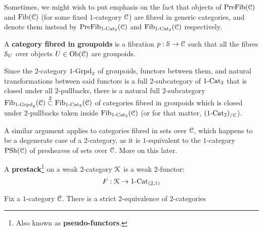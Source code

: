             \begin{convention}
                Sometimes, we might wish to put emphasis on the fact that objects of $\Pre\Fib(\C)$ and $\Fib(\C)$ (for some fixed $1$-category $\C$) are fibred in generic categories, and denote them instead by $\Pre\Fib_{1\-\Cat_2}(\C)$ and $\Fib_{1\-\Cat_2}(\C)$ respectively.
            \end{convention}
            \begin{definition} \label{def: categories_fibred_in_groupoids}
                A \textbf{category fibred in groupoids} is a fibration $p: \S \to \C$ such that all the fibres $\S_U$ over objects $U \in \Ob(\C)$ are groupoids. 
            \end{definition}
            \begin{remark}
                Since the $2$-category $1\-\Grpd_2$ of groupoids, functors between them, and natural transformations between said functors is a full $2$-subcategory of $1\-\Cat_2$ that is closed under all $2$-pullbacks, there is a natural full $2$-subcategory $\Fib_{1\-\Grpd_2}(\C) \overset{2}{\subset} \Fib_{1\-\Cat_2}(\C)$ of categories fibred in groupoids which is closed under $2$-pullbacks taken inside $\Fib_{1\-\Cat_2}(\C)$ (or for that matter, $(1\-\Cat_2)_{/\C}$).
                
                A similar argument applies to categories fibred in sets over $\C$, which happens to be a degenerate case of a $2$-category, as it is $1$-equivalent to the $1$-category $\Psh(\C)$ of presheaves of sets over $\C$. More on this later. 
            \end{remark}
            
            \begin{definition}[Prestacks] \label{def: prestacks}
                A \textbf{prestack}\footnote{Also known as \textbf{pseudo-functors}.} on a weak $2$-category $\calK$ is a weak $2$-functor:
                    $$F: \calK \to 1\-\Cat_{(2, 1)}$$
            \end{definition}
            \begin{theorem} \label{theorem: grothendieck_construction}
                Fix a $1$-category $\C$. There is a strict $2$-equivalence of $2$-categories
            \end{theorem}
            
